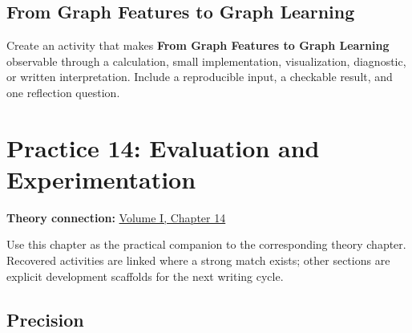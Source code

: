 \documentclass[
  letterpaper,
]{scrbook}
\begin{document}
\section*{From Graph Features to Graph
Learning}\label{sec-pr-13-from-graph-features-to-graph-learning}


\begin{tcolorbox}[enhanced jigsaw, arc=.35mm, bottomrule=.15mm, bottomtitle=1mm, breakable, colback=white, colbacktitle=quarto-callout-note-color!10!white, colframe=quarto-callout-note-color-frame, coltitle=black, left=2mm, leftrule=.75mm, opacityback=0, opacitybacktitle=0.6, rightrule=.15mm, title=\textcolor{quarto-callout-note-color}{\faInfo}\hspace{0.5em}{Practice development scaffold}, titlerule=0mm, toprule=.15mm, toptitle=1mm]

Create an activity that makes \textbf{From Graph Features to Graph
Learning} observable through a calculation, small implementation,
visualization, diagnostic, or written interpretation. Include a
reproducible input, a checkable result, and one reflection question.

\end{tcolorbox}

\chapter*{Practice 14: Evaluation and
Experimentation}\label{ch-practice-14}


\textbf{Theory connection:} \hyperref[ch-evaluation]{Volume I, Chapter
14}

Use this chapter as the practical companion to the corresponding theory
chapter. Recovered activities are linked where a strong match exists;
other sections are explicit development scaffolds for the next writing
cycle.

\section*{Precision}\label{sec-pr-14-precision}

\end{document}
